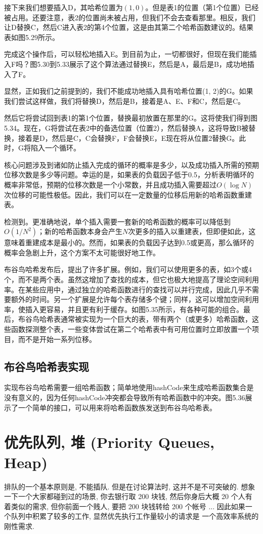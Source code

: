 \documentclass[a4paper]{ctexart}
\theoremstyle{definition}
\theoremstyle{definition}
\begin{document}
接下来我们想要插入D，其哈希位置为\( (1, 0) \)。但是表1的位置（第1个位置）已经被占用。还要注意，表2的位置尚未被占用，但我们不会去查看那里。相反，我们让D替换C，然后C进入表2的第4个位置，这是由其第二个哈希函数建议的。结果表如图5.29所示。

完成这个操作后，可以轻松地插入E。到目前为止，一切都很好，但现在我们能插入F吗？图5.30到5.33展示了这个算法通过替换E，然后是A，最后是B，成功地插入了F。

显然，正如我们之前提到的，我们不能成功地插入具有哈希位置(1, 2)的G。如果我们尝试这样做，我们将替换D，然后是B，接着是A、E、F和C，然后是C。

然后它将尝试回到表1的第1个位置，替换最初放置在那里的G。这将使我们得到图5.34。现在，G将尝试在表2中的备选位置（位置2），然后替换A，这将导致B被替换，接着是D，然后是C，C会替换F，F会替换E，E现在将从位置2替换G。此时，G将陷入一个循环。

核心问题涉及到诸如防止插入完成的循环的概率是多少，以及成功插入所需的预期位移次数是多少等问题。幸运的是，如果表的负载因子低于0.5，分析表明循环的概率非常低，预期的位移次数是一个小常数，并且成功插入需要超过\( O(\log N) \)次位移的可能性极低。因此，我们可以在一定数量的位移后用新的哈希函数重建表。

检测到。更准确地说，单个插入需要一套新的哈希函数的概率可以降低到\( O(1/N^2) \)；新的哈希函数本身会产生\( N \)次更多的插入以重建表，但即便如此，这意味着重建成本是最小的。然而，如果表的负载因子达到0.5或更高，那么循环的概率会急剧上升，这个方案不太可能很好地工作。

布谷鸟哈希发布后，提出了许多扩展。例如，我们可以使用更多的表，如3个或4个，而不是两个表。虽然这增加了查找的成本，但它也极大地提高了理论空间利用率。在某些应用中，通过独立的哈希函数进行的查找可以并行完成，因此几乎不需要额外的时间。另一个扩展是允许每个表存储多个键；同样，这可以增加空间利用率，使插入更容易，并且更有利于缓存。如图5.35所示，有各种可能的组合。最后，布谷鸟哈希表通常被实现为一个巨大的表，带有两个（或更多）哈希函数，这些函数探测整个表，一些变体尝试在第二个哈希表中有可用位置时立即放置一个项目，而不是开始一系列位移。

\subsection*{布谷鸟哈希表实现}

实现布谷鸟哈希需要一组哈希函数；简单地使用hashCode来生成哈希函数集合是没有意义的，因为任何hashCode冲突都会导致所有哈希函数中的冲突。图5.36展示了一个简单的接口，可以用来将哈希函数族发送到布谷鸟哈希表。


\section{优先队列, 堆 (Priority Queues, Heap)}
排队的一个基本原则是, 不能插队. 但是在讨论算法时, 这并不是不可突破的.
想象一下一个大家都碰到过的场景, 你去银行取 200 块钱, 然后你身后大概 20
个人有着类似的需求, 但你前面一个贱人, 要把 200 块钱转给 200 个帐号
... 因此如果一个队列中积累了较多的工作, 显然优先执行工作量较小的请求是
一个高效率系统的刚性需求.
\end{document}
